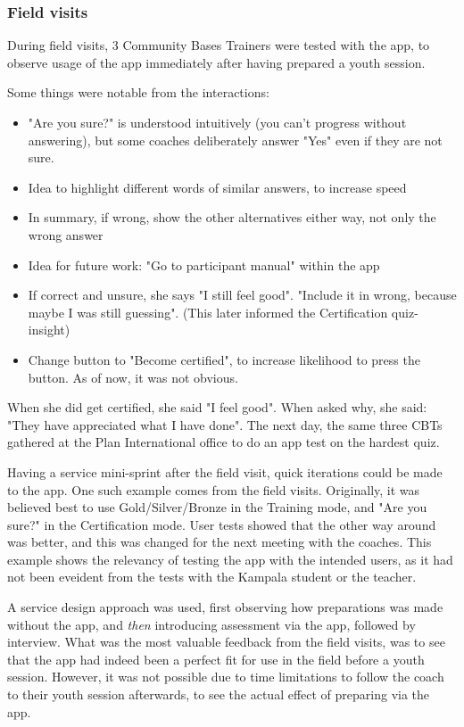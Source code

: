   \subsubsection{Field visits}

  During field visits, 3 Community Bases Trainers were tested with the app, to observe usage of the app immediately after having prepared a youth session.

  Some things were notable from the interactions:  %
  \begin{itemize}
    \item "Are you sure?" is understood intuitively (you can't progress without answering), but some coaches deliberately answer "Yes" even if they are not sure.
    \item Idea to highlight different words of similar answers, to increase speed
    \item In summary, if wrong, show the other alternatives either way, not only the wrong answer
    \item Idea for future work: "Go to participant manual" within the app %
    \item If correct and unsure, she says "I still feel good". "Include it in wrong, because maybe I was still guessing". (This later informed the Certification quiz-insight)
    \item Change button to "Become certified", to increase likelihood to press the button. As of now, it was not obvious.
  \end{itemize}

  When she did get certified, she said "I feel good". When asked why, she said: "They have appreciated what I have done". The next day, the same three CBTs gathered at the Plan International office to do an app test on the hardest quiz.

  Having a service mini-sprint after the field visit, quick iterations could be made to the app. One such example comes from the field visits. Originally, it was believed best to use Gold/Silver/Bronze in the Training mode, and "Are you sure?" in the Certification mode. User tests showed that the other way around was better, and this was changed for the next meeting with the coaches. This example shows the relevancy of testing the app with the intended users, as it had not been eveident from the tests with the Kampala student or the teacher.

  A service design approach was used, first observing how preparations was made without the app, and \textit{then} introducing assessment via the app, followed by interview. What was the most valuable feedback from the field visits, was to see that the app had indeed been a perfect fit for use in the field before a youth session. However, it was not possible due to time limitations to follow the coach to their youth session afterwards, to see the actual effect of preparing via the app.

